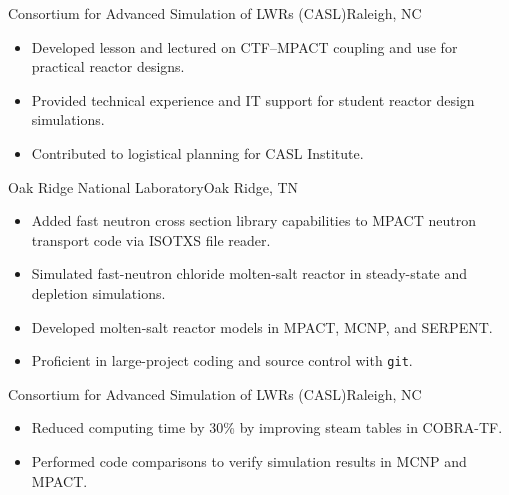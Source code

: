 \documentclass[letterpaper,12pt,nocolor,final]{moderncv}
\begin{document}
  {Consortium for Advanced Simulation of LWRs (CASL)}{Raleigh, NC}{}{
  \begin{itemize}
    \item Developed lesson and lectured on CTF--MPACT coupling and use for practical reactor designs.
    \item Provided technical experience and IT support for student reactor design simulations.
    \item Contributed to logistical planning for CASL Institute.
  \end{itemize}}

{Oak Ridge National Laboratory}{Oak Ridge, TN}{}{
  \begin{itemize}
    \item Added fast neutron cross section library capabilities to MPACT neutron transport code via ISOTXS file reader.
    \item Simulated fast-neutron chloride molten-salt reactor in steady-state and depletion simulations.
    \item Developed molten-salt reactor models in MPACT, MCNP, and SERPENT.
    \item Proficient in large-project coding and source control with 
      \texttt{git}.
  \end{itemize}}

{Consortium for Advanced Simulation of LWRs (CASL)}{Raleigh, NC}{}{
  \begin{itemize}
    \item Reduced computing time by 30\% by improving steam tables in COBRA-TF.
    \item Performed code comparisons to verify simulation results in MCNP and 
      MPACT.
  \end{itemize}}
\end{document}
